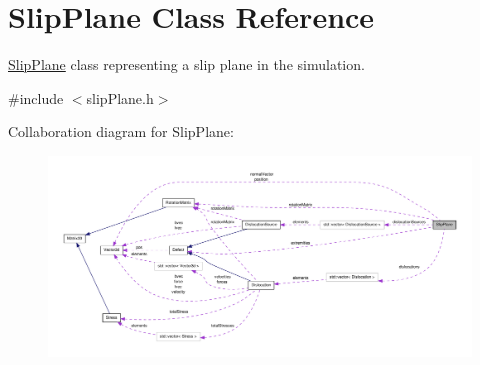 \hypertarget{classSlipPlane}{\section{\-Slip\-Plane \-Class \-Reference}
\label{db/d25/classSlipPlane}
}


\hyperlink{classSlipPlane}{\-Slip\-Plane} class representing a slip plane in the simulation.  




{\ttfamily \#include $<$slip\-Plane.\-h$>$}



\-Collaboration diagram for \-Slip\-Plane\-:\nopagebreak
\begin{figure}[H]
\begin{center}
\leavevmode
\includegraphics[width=350pt]{d2/da3/classSlipPlane__coll__graph}
\end{center}
\end{figure}
